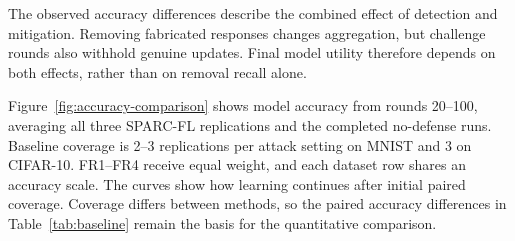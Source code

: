 \documentclass[journal]{IEEEtran}
\begin{document}


The observed accuracy differences describe the combined effect of detection and
mitigation. Removing fabricated responses changes aggregation, but
challenge rounds also withhold genuine updates. Final model utility
therefore depends on both effects, rather than on removal recall alone.

Figure~\ref{fig:accuracy-comparison} shows model accuracy from rounds
20--100, averaging all three SPARC-FL replications and the completed
no-defense runs. Baseline coverage is 2--3
replications per attack setting on MNIST and 3
on CIFAR-10. FR1--FR4 receive equal weight,
and each dataset row shares an accuracy scale. The curves show how
learning continues after initial paired coverage. Coverage differs
between methods, so the paired accuracy differences in
Table~\ref{tab:baseline} remain the basis for the quantitative comparison.
\end{document}

